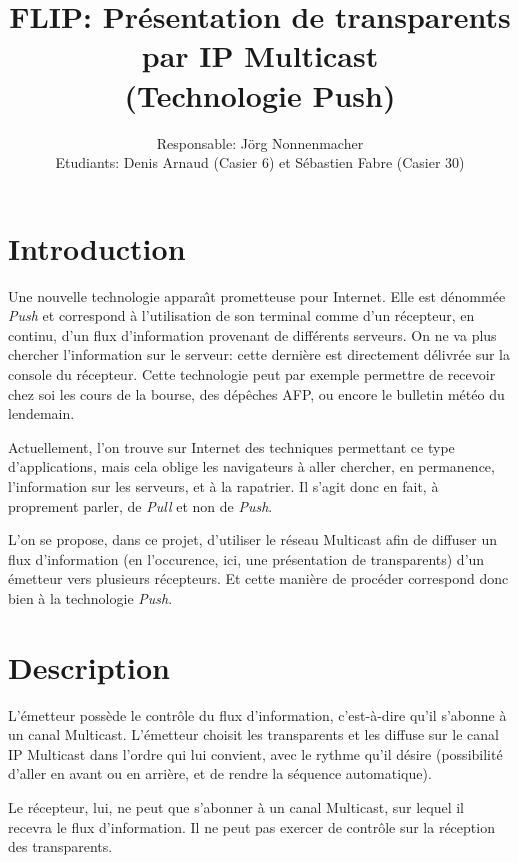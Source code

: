 \documentclass[12p]{article}
\begin{document}
\title{FLIP: Pr\'esentation de transparents par IP Multicast\\(Technologie Push)}
\author{Responsable: J\"org Nonnenmacher\\Etudiants: Denis Arnaud (Casier 6) et S\'ebastien Fabre (Casier 30)}
\maketitle

\section{Introduction}
Une nouvelle technologie appara\^{\i}t prometteuse pour Internet. Elle est
d\'enomm\'ee {\it Push} et correspond \`a l'utilisation de son terminal
comme d'un r\'ecepteur, en continu, d'un flux d'information provenant de
diff\'erents serveurs. On ne va plus chercher l'information sur le serveur:
cette derni\`ere est directement d\'elivr\'ee sur la console du
r\'ecepteur. Cette technologie peut par exemple permettre de recevoir chez
soi les cours de la bourse, des d\'ep\^eches AFP, ou encore le bulletin
m\'et\'eo du lendemain.

Actuellement, l'on trouve sur Internet des techniques permettant ce type
d'applications, mais cela oblige les navigateurs \`a aller chercher, en
permanence, l'information sur les serveurs, et \`a la rapatrier. Il s'agit
donc en fait, \`a proprement parler, de {\it Pull} et non de {\it Push}.

L'on se propose, dans ce projet, d'utiliser le r\'eseau Multicast afin de
diffuser un flux d'information (en l'occurence, ici, une pr\'esentation de
transparents) d'un \'emetteur vers plusieurs r\'ecepteurs. Et cette
mani\`ere de proc\'eder correspond donc bien \`a la technologie {\it Push}.

\section{Description}
L'\'emetteur poss\`ede le contr\^ole du flux d'information, c'est-\`a-dire
qu'il s'abonne \`a un canal Multicast. L'\'emetteur choisit les
transparents et les diffuse sur le canal IP Multicast dans l'ordre qui lui
convient, avec le rythme qu'il d\'esire (possibilit\'e d'aller en avant ou
en arri\`ere, et de rendre la s\'equence automatique).

Le r\'ecepteur, lui, ne peut que s'abonner \`a un canal Multicast, sur
lequel il recevra le flux d'information. Il ne peut pas exercer de
contr\^ole sur la r\'eception des transparents.
\end{document}
